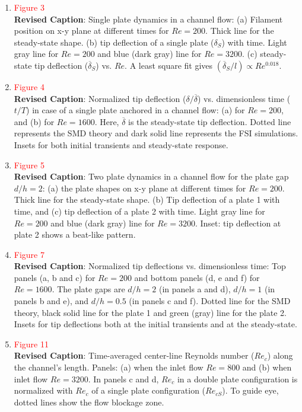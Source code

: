 \documentclass[onecolumn,a4paper,amsmath,amssym,pre]{revtex4}
\begin{document}
    \begin{enumerate}    
    	
    	\item \textcolor{red}{Figure 3}\\
    	\textbf{Revised Caption}: Single plate dynamics in a channel flow: (a) Filament position on x-y plane at different times for $Re=200$. Thick line for the steady-state shape. (b) tip deflection of a single plate ($\delta_S$) with time. Light gray line for $Re=200$ and blue (dark gray) line for $Re=3200$. (c) steady-state tip deflection ($\overline{\delta}_S$) vs. $Re$. A least square fit gives $(\overline{\delta}_S/l)\propto Re^{0.018}$.
    	
    	
    	\item \textcolor{red}{Figure 4}\\
    	\textbf{Revised Caption}: Normalized tip deflection ($\delta/\overline{\delta}$) vs. dimensionless time ($t/T$) in case of a single plate anchored in a channel flow: (a) for $Re=200$, and (b) for $Re=1600$. Here, $\overline{\delta}$ is the steady-state tip deflection. Dotted line represents the SMD theory and dark solid line represents the FSI simulations. Insets for both initial transients and steady-state response.
    	
    	
    	\item \textcolor{red}{Figure 5}\\
    	\textbf{Revised Caption}: Two plate dynamics in a channel flow for the plate gap $d/h=2$: (a) the plate shapes on x-y plane at different times for $Re=200$. Thick line for the steady-state shape. (b) Tip deflection of a plate 1 with time, and (c) tip deflection of a plate 2 with time.  Light gray line for $Re=200$ and blue (dark gray) line for $Re=3200$. Inset: tip deflection at plate 2 shows a beat-like pattern.
    	
    	\item \textcolor{red}{Figure 7}\\
    	\textbf{Revised Caption}: Normalized tip deflections vs. dimensionless time: Top panels (a, b and c) for $Re=200$ and bottom panels (d, e and f) for $Re=1600$. The plate gaps are $d/h=2$ (in panels a and d), $d/h=1$ (in panels b and e), and $d/h=0.5$ (in panels c and f). Dotted line for the SMD theory, black solid line for the plate 1 and green (gray) line for the plate 2. Insets for tip deflections both at the initial transients and at the steady-state.
    		
    	\item \textcolor{red}{Figure 11}\\
    	\textbf{Revised Caption}: Time-averaged center-line Reynolds number ($Re_c$) along the channel's length. Panels: (a) when the inlet flow $Re=800$ and (b) when inlet flow $Re=3200$. In panels c and d, $Re_c$ in a double plate configuration is normalized with $Re_c$ of a single plate configuration ($Re_{cS}$). To guide eye, dotted lines show the flow blockage zone.
    	

\end{enumerate}
\end{document}
